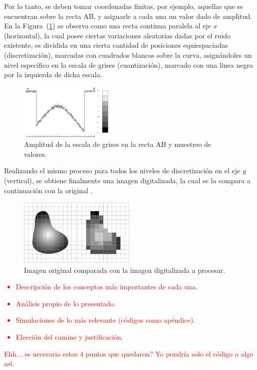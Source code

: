 Por lo tanto, se deben tomar coordenadas finitas, por ejemplo, aquellas que se encuentran sobre la recta AB, y asignarle a cada una un valor dado de amplitud. En la Figura~(\ref{fig:disc2}) se observa como una recta continua paralela al eje $x$ (horizontal), la cual posee ciertas variaciones aleatorias dadas por el ruido existente, es dividida en una cierta cantidad de posiciones equiespaciadas (discretización), marcadas con cuadrados blancos sobre la curva, asignándoles un nivel específico en la escala de grises (cuantización), marcado con una linea negra por la izquierda de dicha escala.
\begin{figure}[H]
\centering
	\includegraphics[width=0.4\textwidth]{Imagenes/Digitalizacion_2.png}
	\caption{Amplitud de la escala de grises en la recta AB y muestreo de valores.}
	\label{fig:disc2}
\end{figure}

Realizando el mismo proceso para todos los niveles de discretización en el eje $y$ (vertical), se obtiene finalmente una imagen digitalizada, la cual se la compara a continuación con la original \cite{ref:digit1}.
\begin{figure}[H]
\centering
	\includegraphics[width=0.5\textwidth]{Imagenes/Digitalizacion_3.png}
	\caption{Imagen original comparada con la imagen digitalizada a procesar.}
	\label{fig:disc3}
\end{figure}

\textcolor{red}{
\begin{itemize}
	\item Descripción de los conceptos más importantes de cada una.
	\item Análisis propio de lo presentado.
	\item Simulaciones de lo más relevante (códigos como apéndice).
	\item Elección del camino y justificación.
\end{itemize}
}
\textcolor{red}{Ehh... es necesario estos 4 puntos que quedaron? Yo pondría solo el código o algo así.}

